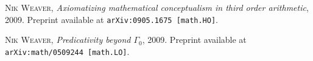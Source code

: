 \documentclass[bsl,meeting]{asl}
\begin{document}
\begin{thebibliography}{10}

  {\scshape Nik Weaver},
  {\itshape Axiomatizing mathematical conceptualism in third order arithmetic}, 2009.
  Preprint available at \texttt{arXiv:0905.1675 [math.HO]}.

  {\scshape Nik Weaver},
  {\itshape Predicativity beyond {$\Gamma_0$}}, 2009.
  Preprint available at \texttt{arXiv:math/0509244 [math.LO]}.

\end{thebibliography}

\vspace*{-0.5\baselineskip}
\end{document}
